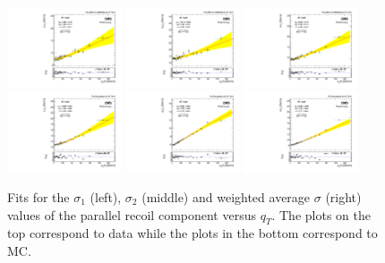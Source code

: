 \begin{figure} [h!]
 \begin{center}
  \includegraphics[width=0.3\textwidth]{Figures/WBoson/Analysis/Correction/Recoil/RecoilFitsqT/Data/fitPFu1sigma1.pdf}
  \includegraphics[width=0.3\textwidth]{Figures/WBoson/Analysis/Correction/Recoil/RecoilFitsqT/Data/fitPFu1sigma2.pdf}
  \includegraphics[width=0.3\textwidth]{Figures/WBoson/Analysis/Correction/Recoil/RecoilFitsqT/Data/fitPFu1sigma.pdf} \\
  \includegraphics[width=0.3\textwidth]{Figures/WBoson/Analysis/Correction/Recoil/RecoilFitsqT/MC/fitPFu1sigma1.pdf}
  \includegraphics[width=0.3\textwidth]{Figures/WBoson/Analysis/Correction/Recoil/RecoilFitsqT/MC/fitPFu1sigma2.pdf}
  \includegraphics[width=0.3\textwidth]{Figures/WBoson/Analysis/Correction/Recoil/RecoilFitsqT/MC/fitPFu1sigma.pdf}
 \caption{Fits for the $\sigma_{1}$ (left), $\sigma_{2}$ (middle) and weighted average $\sigma$ (right) values of the parallel recoil component versus $q_{T}$. The plots on the top correspond to data while the plots in the bottom correspond to \ZToMuMu MC.}
 \label{fig:figU1RecoilResolutionFit}
 \end{center}
\end{figure}

